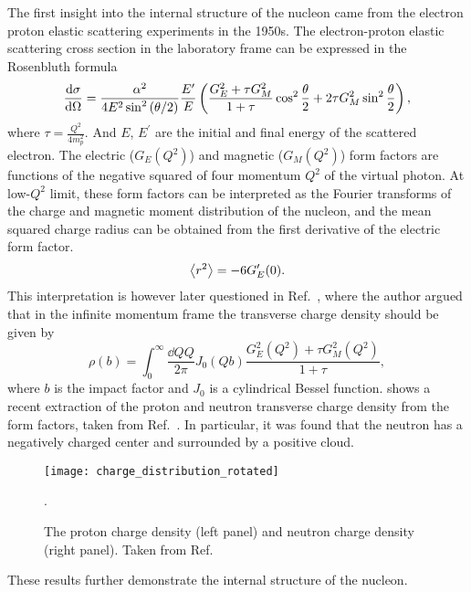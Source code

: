 \documentclass[../main.tex]{subfiles}
\begin{document}
The first insight into the internal structure of the nucleon came from the
electron proton elastic scattering experiments \cite{hofstadter1956} in the
1950s. The electron-proton elastic scattering cross section in the laboratory
frame can be expressed in the Rosenbluth formula \cite{rosenbluth1950}
\begin{equation}
	\dv{\sigma}{\Omega} = \frac{\alpha^2}{4E^2 \sin^2\left(\theta/2\right)}
	\frac{E^\prime}{E} \left( \frac{G_E^2+\tau G_M^2}{1+\tau} \cos^2
	\frac{\theta}{2} + 2\tau G_M^2 \sin^2 \frac{\theta}{2}\right)
	\label{eq:ep_cs},
\end{equation}
where $\tau = \frac{Q^2}{4m_p^2}$.
And $E$, $E^\prime$ are the initial and final energy of the scattered electron.
The electric ($G_E\left(Q^2\right)$) and magnetic ($G_M\left(Q^2\right)$) form
factors are functions of the negative squared of four momentum $Q^2$ of the virtual photon. At
low-$Q^2$ limit, these form factors can be interpreted as the Fourier transforms
of the charge and magnetic moment distribution of the nucleon, and the mean squared
charge radius can be obtained from the first derivative of the electric form factor.
\begin{equation}
	\expval{r^2}=-6G^\prime_E(0).
\end{equation}
This interpretation is however later questioned in Ref.~\cite{miller2007,miller2019},
where the author argued that in the infinite momentum frame the transverse charge
density should be given by
\begin{equation}
	\rho(b)=\int^\infty_0 \frac{\dd{Q}Q}{2\pi} J_0(Qb)\frac{G_E^2(Q^2)+\tau G_M^2(Q^2)}{1+\tau},
\end{equation}
where $b$ is the impact factor and $J_0$ is a cylindrical Bessel function.
shows a recent extraction of the proton and neutron transverse charge density from the
form factors, taken from Ref.~\cite{miller2007}. In particular, it was found that
the neutron has a negatively charged center and surrounded by a positive cloud.
\begin{figure}[hbp!]
	\centering
	\texttt{[image: charge\_distribution\_rotated]}
	\caption{The proton charge density (left panel) and neutron charge density
		(right panel). Taken from Ref.~\cite{miller2007}}.
	\label{fig:charge}
\end{figure}
These results further demonstrate the internal structure of the nucleon.
\end{document}
